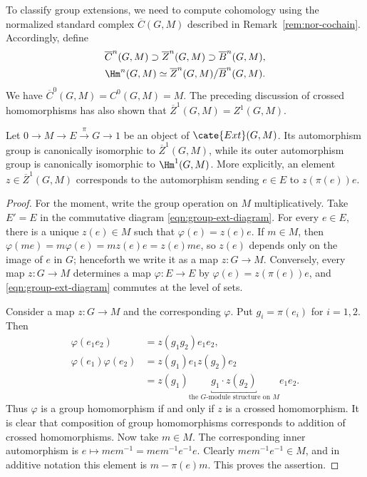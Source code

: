 To classify group extensions, we need to compute cohomology using the
normalized standard complex $\overline{C}(G,M)$ described in
Remark~\ref{rem:nor-cochain}. Accordingly, define
\begin{gather*}
	\overline{C}^n(G,M)\supset\overline{Z}^n(G,M)
	\supset\overline{B}^n(G,M),\\
	\Hm^n(G,M)\simeq\overline{Z}^n(G,M)/\overline{B}^n(G,M).
\end{gather*}
We have $\overline{C}^0(G,M)=C^0(G,M)=M$. The preceding discussion of
crossed homomorphisms has also shown that
$\overline{Z}^1(G,M)=Z^1(G,M)$.

\begin{lemma}\label{prop:factor-set-prep}
	Let $0\to M\to E\xrightarrow{\pi}G\to1$ be an object of
	$\cate{Ext}(G,M)$. Its automorphism group is canonically isomorphic to
	$\overline{Z}^1(G,M)$, while its outer automorphism group is canonically
	isomorphic to $\Hm^1(G,M)$. More explicitly, an element
	$z\in\overline{Z}^1(G,M)$ corresponds to the automorphism sending
	$e\in E$ to $z(\pi(e))e$.
\end{lemma}
\begin{proof}
	For the moment, write the group operation on $M$ multiplicatively. Take
	$E'=E$ in the commutative diagram \eqref{eqn:group-ext-diagram}. For every
	$e\in E$, there is a unique $z(e)\in M$ such that $\varphi(e)=z(e)e$.
	If $m\in M$, then
	$\varphi(me)=m\varphi(e)=mz(e)e=z(e)me$, so $z(e)$ depends only on the
	image of $e$ in $G$; henceforth we write it as a map $z:G\to M$.
	Conversely, every map $z:G\to M$ determines a map $\varphi:E\to E$ by
	$\varphi(e)=z(\pi(e))e$, and \eqref{eqn:group-ext-diagram} commutes at
	the level of sets.

	Consider a map $z:G\to M$ and the corresponding $\varphi$. Put
	$g_i=\pi(e_i)$ for $i=1,2$. Then
	\begin{align*}
		\varphi(e_1e_2)&=z(g_1g_2)e_1e_2,\\
		\varphi(e_1)\varphi(e_2)&=z(g_1)e_1z(g_2)e_2\\
		&=z(g_1)\underbracket{g_1\cdot z(g_2)}_{
		\text{the $G$-module structure on $M$}}e_1e_2.
	\end{align*}
	Thus $\varphi$ is a group homomorphism if and only if $z$ is a crossed
	homomorphism. It is clear that composition of group homomorphisms
	corresponds to addition of crossed homomorphisms. Now take $m\in M$.
	The corresponding inner automorphism is
	$e\mapsto mem^{-1}=mem^{-1}e^{-1}e$. Clearly
	$mem^{-1}e^{-1}\in M$, and in additive notation this element is
	$m-\pi(e)m$. This proves the assertion.
\end{proof}

